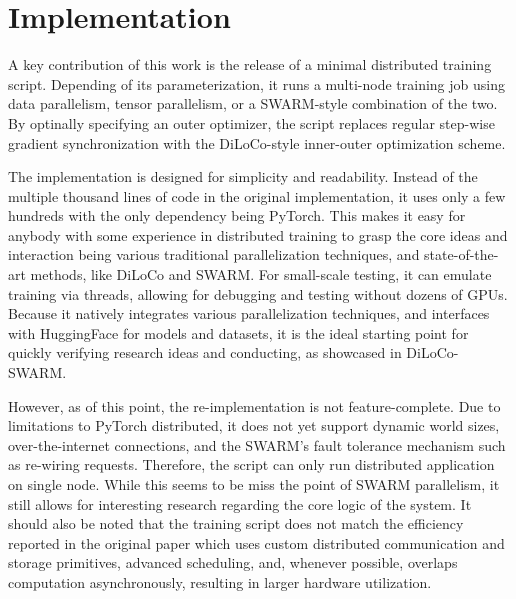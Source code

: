 \documentclass[conference, 10pt]{IEEEtran}
\begin{document}

\section{Implementation}

A key contribution of this work is the release of a minimal distributed training
script. Depending of its parameterization, it runs a multi-node training job
using data parallelism, tensor parallelism, or a SWARM-style combination of the
two. By optinally specifying an outer optimizer, the script replaces regular
step-wise gradient synchronization with the DiLoCo-style inner-outer
optimization scheme.

The implementation is designed for simplicity and readability. Instead of the
multiple thousand lines of code in the original implementation, it uses only a
few hundreds with the only dependency being PyTorch. This makes it easy for
anybody with some experience in distributed training to grasp the core ideas and
interaction being various traditional parallelization techniques, and 
state-of-the-art methods, like DiLoCo and SWARM. For small-scale testing, it can
emulate training via threads, allowing for debugging and testing without dozens
of GPUs. Because it natively integrates various parallelization techniques, and
interfaces with HuggingFace for models and datasets, it is the ideal starting
point for quickly verifying research ideas and conducting, as showcased in
DiLoCo-SWARM.

However, as of this point, the re-implementation is not feature-complete. Due to
limitations to PyTorch distributed, it does not yet support dynamic world sizes,
over-the-internet connections, and the SWARM's fault tolerance mechanism such as
re-wiring requests. Therefore, the script can only run distributed application
on single node. While this seems to be miss the point of SWARM parallelism, it
still allows for interesting research regarding the core logic of the system. It
should also be noted that the training script does not match the efficiency
reported in the original paper which uses custom distributed communication and
storage primitives, advanced scheduling, and, whenever possible, overlaps
computation asynchronously, resulting in larger hardware utilization.

\end{document}
